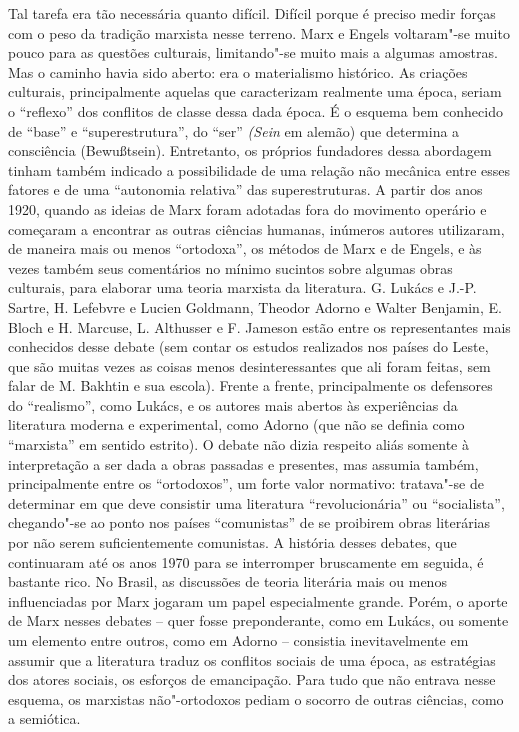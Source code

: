 Tal tarefa era tão necessária quanto difícil. Difícil porque é preciso
medir forças com o peso da tradição marxista nesse terreno. Marx e
Engels voltaram"-se muito pouco para as questões culturais, limitando"-se
muito mais a algumas amostras. Mas o caminho havia sido aberto: era o
materialismo histórico. As criações culturais, principalmente aquelas
que caracterizam realmente uma época, seriam o ``reflexo'' dos conflitos
de classe dessa dada época. É o esquema bem conhecido de ``base'' e
``superestrutura'', do ``ser'' \emph{(Sein} em alemão) que determina a
consciência (Bewußtsein). Entretanto, os próprios fundadores dessa
abordagem tinham também indicado a possibilidade de uma relação não
mecânica entre esses fatores e de uma ``autonomia relativa'' das
superestruturas. A partir dos anos 1920, quando as ideias de Marx foram
adotadas fora do movimento operário e começaram a encontrar as outras
ciências humanas, inúmeros autores utilizaram, de maneira mais ou menos
``ortodoxa'', os métodos de Marx e de Engels, e às vezes também seus
comentários no mínimo sucintos sobre algumas obras culturais, para
elaborar uma teoria marxista da literatura. G. Lukács e J.-P. Sartre, H.
Lefebvre e Lucien Goldmann, Theodor Adorno e Walter Benjamin, E. Bloch e
H. Marcuse, L. Althusser e F. Jameson estão entre os representantes mais
conhecidos desse debate (sem contar os estudos realizados nos países do
Leste, que são muitas vezes as coisas menos desinteressantes que ali
foram feitas, sem falar de M. Bakhtin e sua escola). Frente a frente,
principalmente os defensores do ``realismo'', como Lukács, e os autores
mais abertos às experiências da literatura moderna e experimental, como
Adorno (que não se definia como ``marxista'' em sentido estrito). O
debate não dizia respeito aliás somente à interpretação a ser dada a
obras passadas e presentes, mas assumia também, principalmente entre os
``ortodoxos'', um forte valor normativo: tratava"-se de determinar em que
deve consistir uma literatura ``revolucionária'' ou ``socialista'',
chegando"-se ao ponto nos países ``comunistas'' de se proibirem obras
literárias por não serem suficientemente comunistas. A história desses
debates, que continuaram até os anos 1970 para se interromper
bruscamente em seguida, é bastante rico. No Brasil, as discussões de
teoria literária mais ou menos influenciadas por Marx jogaram um papel
especialmente grande. Porém, o aporte de Marx nesses debates -- quer
fosse preponderante, como em Lukács, ou somente um elemento entre
outros, como em Adorno -- consistia inevitavelmente em assumir que a
literatura traduz os conflitos sociais de uma época, as estratégias dos
atores sociais, os esforços de emancipação. Para tudo que não entrava
nesse esquema, os marxistas não"-ortodoxos pediam o socorro de outras
ciências, como a semiótica.

